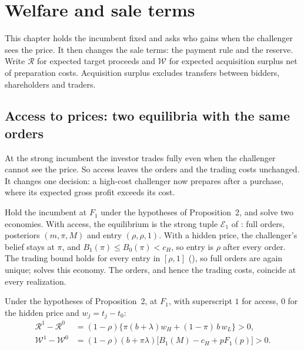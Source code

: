 \section{Welfare and sale terms}\label{sec:11_welfare}

This chapter holds the incumbent fixed and asks who gains when the challenger sees the price. It then changes the
sale terms: the payment rule and the reserve. Write \(\mathcal R\) for expected target proceeds and \(\mathcal W\) for
expected acquisition surplus net of preparation costs. Acquisition surplus excludes transfers between bidders,
shareholders and traders. 

\subsection{Access to prices: two equilibria with the same orders}\label{sec:11_welfare-access}

\begin{intuition}
At the strong incumbent the investor trades fully even when the challenger cannot see the price. So access leaves
the orders and the trading costs unchanged. It changes one decision: a high-cost challenger now prepares after a
purchase, where its expected gross profit exceeds its cost.
\end{intuition}

Hold the incumbent at \(F_1\) under the hypotheses of Proposition~2, and solve two economies. With access, the
equilibrium is the strong tuple \(\mathcal E_1\) of : full orders, posteriors
\((m,\pi,M)\) and entry \((\rho,\rho,1)\). With a hidden price, the challenger's belief stays at \(\pi\), and
\(B_1(\pi)\le B_0(\pi)<c_H\), so entry is \(\rho\) after every order. The trading bound holds for every entry in
\([\rho,1]\) (), so full orders are again unique;  solves
this economy. The orders, and hence the trading costs, coincide at every realization.

\begin{resultbox}
Under the hypotheses of Proposition~2, at \(F_1\), with superscript \(1\) for access, \(0\) for the hidden price and
\(w_j=t_j-t_0\):
\begin{align*}
\mathcal R^1-\mathcal R^0&=(1-\rho)\bigl\{\pi(b+\lambda)w_H+(1-\pi)\,b\,w_L\bigr\}>0,\\
\mathcal W^1-\mathcal W^0&=(1-\rho)(b+\pi\lambda)\bigl[B_1(M)-c_H+pF_1(p)\bigr]>0.
\end{align*}
\end{resultbox}

